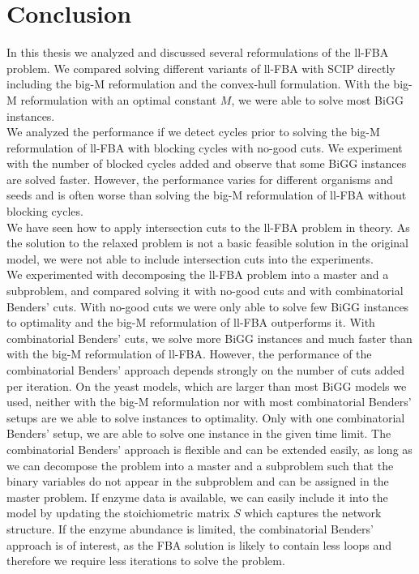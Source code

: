 \clearpage
\thispagestyle{plain}
\section{Conclusion}

In this thesis we analyzed and discussed several reformulations of the ll-FBA problem. 
We compared solving different variants of ll-FBA with \textsf{SCIP} directly including the big-M reformulation and the convex-hull formulation. With the big-M reformulation with an optimal constant $M$, we were able to solve most BiGG instances. \\
We analyzed the performance if we detect cycles prior to solving the big-M reformulation of ll-FBA with blocking cycles with no-good cuts. We experiment with the number of blocked cycles added and observe that some BiGG instances are solved faster. However, the performance varies for different organisms and seeds and is often worse than solving the big-M reformulation of ll-FBA without blocking cycles.\\
We have seen how to apply intersection cuts to the ll-FBA problem in theory. As the solution to the relaxed problem is not a basic feasible solution in the original model, we were not able to include intersection cuts into the experiments.
\\
We experimented with decomposing the ll-FBA problem into a master and a subproblem, and compared solving it with no-good cuts and with combinatorial Benders' cuts. With no-good cuts we were only able to solve few BiGG instances to optimality and the big-M reformulation of ll-FBA outperforms it. With combinatorial Benders' cuts, we solve more BiGG instances and much faster than with the big-M reformulation of ll-FBA. However, the performance of the combinatorial Benders' approach depends strongly on the number of cuts added per iteration.  On the yeast models, which are larger than most BiGG models we used, neither with the big-M reformulation nor with most combinatorial Benders' setups are we able to solve instances to optimality. Only with one combinatorial Benders' setup, we are able to solve one instance in the given time limit. 
The combinatorial Benders' approach is flexible and can be extended easily, as long as we can decompose the problem into a master and a subproblem such that the binary variables do not appear in the subproblem and can be assigned in the master problem. If enzyme data is available, we can easily include it into the model by updating the stoichiometric matrix $S$ which captures the network structure. If the enzyme abundance is limited, the combinatorial Benders' approach is of interest, as the FBA solution is likely to contain less loops and therefore we require less iterations to solve the problem.

